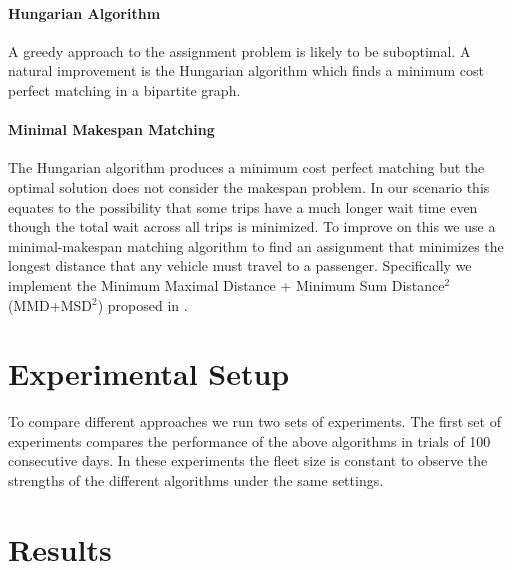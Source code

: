 \documentclass[letterpaper]{article}
\begin{document}
\paragraph{Hungarian Algorithm}
A greedy approach to the assignment problem is likely to be suboptimal. A natural improvement is the Hungarian algorithm \cite{kuhn1955hungarian} which finds a minimum cost perfect matching in a bipartite graph. 

\paragraph{Minimal Makespan Matching}
The Hungarian algorithm produces a minimum cost perfect matching but the optimal solution does not consider the makespan problem. In our scenario this equates to the possibility that some trips have a much longer wait time even though the total wait across all trips is minimized. To improve on this we use a minimal-makespan matching algorithm to find an assignment that minimizes the longest distance that any vehicle must travel to a passenger. Specifically we implement the Minimum Maximal Distance + Minimum Sum Distance$^2$ (MMD+MSD$^2$) proposed in \cite{macalpine2015scram}.

\section{Experimental Setup}
To compare different approaches we run two sets of experiments. The first set of experiments compares the performance of the above algorithms in trials of 100 consecutive days. In these experiments the fleet size is constant to observe the strengths of the different algorithms under the same settings.

\section{Results}




\end{document}
